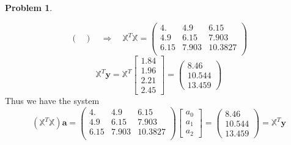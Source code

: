 \documentclass[10pt]{article}
\theoremstyle{plain}
\theoremstyle{definition}
\newtheorem{prob}{Problem}
\numberwithin{equation}{section}
\begin{document}
\begin{prob}
\begin{enumerate}[\bfseries(a)]
\[\begin{pmatrix}
            \end{pmatrix}
            \quad \Longrightarrow \quad
            \mathbb{X}^T\mathbb{X} = 
            \begin{pmatrix} 
            4.    &   4.9   &   6.15  \\
            4.9   &   6.15  &   7.903 \\
            6.15  &   7.903 &  10.3827\\
        \end{pmatrix}
            \]
    \[
        \mathbb{X}^T \bm{y} = \mathbb{X}^T \begin{bmatrix} 1.84 \\ 1.96 \\ 2.21 \\ 2.45 \end{bmatrix}
        = \begin{pmatrix}8.46 \\  10.544 \\  13.459 \end{pmatrix}
        \]
    Thus we have the system
    \[
            \left(\mathbb{X}^T\mathbb{X}\right)\bm{a} = 
            \begin{pmatrix} 
            4.    &   4.9   &   6.15  \\
            4.9   &   6.15  &   7.903 \\
            6.15  &   7.903 &  10.3827\\
            \end{pmatrix} \begin{bmatrix} a_0 \\ a_1 \\ a_2 \end{bmatrix}
        = \begin{pmatrix}8.46 \\  10.544 \\  13.459 \end{pmatrix}
        = \mathbb{X}^T \bm{y}
    \]


\end{enumerate}
\end{prob}
\end{document}
